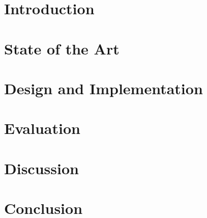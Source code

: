 \documentclass[a4paper, 12pt,titlepage]{dithesis}
\begin{document}
\chapter{Introduction}
\sivunumerot

\chapter{State of the Art}

\chapter{Design and Implementation}

\chapter{Evaluation}

\chapter{Discussion}

\chapter{Conclusion}



\end{document}
